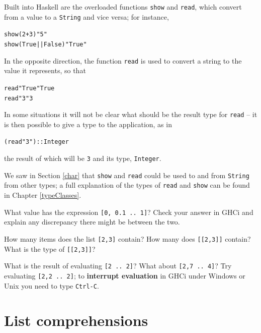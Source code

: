 
Built into Haskell are the overloaded functions \texttt{show}
and \texttt{read}, which convert from a value to a
\texttt{String} and
vice versa; for instance,
\begin{alltt}
show (2+3)           \step{}"5"
show (True || False) \step{}"True"
\end{alltt}
In the opposite direction, the function \texttt{read} is used to convert
a string to the value it represents, so that
\begin{alltt}
read "True" \step{}True
read "3"    \step{}3
\end{alltt}
In some situations it will not be clear what should be the result type
for
\texttt{read} -- it is then possible to give a type to the application,
as in
\begin{alltt}
(read "3") :: Integer
\end{alltt}
the  result of which will be \texttt{3} and its type, \texttt{Integer}. 

We saw in Section \ref{char} that \texttt{show} and \texttt{read} could be used to and from \texttt{String} from other types; a
full explanation of the types of \texttt{read} and \texttt{show} can be
found in Chapter \ref{typeClasses}.


\begin{exercises}

\item
What value has the expression \texttt{[0, 0.1 ..\ 1]}? Check your answer
in GHCi  and explain any discrepancy there might be between the two.

\item
How many items does the list \texttt{[2,3]} contain? How many does \texttt{[[2,3]]}
contain? What is the type of \texttt{[[2,3]]}?

\item
What is the result of evaluating \texttt{[2 ..\ 2]}? What about \texttt{[2,7 ..\ 4]}?
Try evaluating \texttt{[2,2 ..\ 2]}; to \textbf{interrupt evaluation}
 in GHCi under Windows or Unix you
need to type \texttt{Ctrl-C}.
\end{exercises}



\section{List comprehensions}
\label{listComps}

